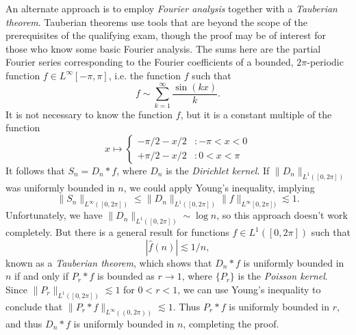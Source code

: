\documentclass[answers]{exam}
\theoremstyle{problemstyle}
\newcommand{\1}[1]{\textbf{1}_{\left[#1\right]}} %
\begin{document}
\begin{questions}
\begin{solution}
An alternate approach is to employ \emph{Fourier analysis} together with a \emph{Tauberian theorem}. Tauberian theorems use tools that  are beyond the scope of the prerequisites of the qualifying exam, though the proof may be of interest for those who know some basic Fourier analysis. The sums here are the partial Fourier series corresponding to the Fourier coefficients of a bounded, $2 \pi$-periodic function $f \in L^\infty[-\pi,\pi]$, i.e. the function $f$ such that
%
\[ f \sim \sum_{k = 1}^\infty \frac{\sin(kx)}{k}. \]
%
It is not necessary to know the function $f$, but it is a constant multiple of the function
%
\[ x \mapsto \begin{cases} -\pi/2 - x/2 &: -\pi < x < 0 \\ +\pi/2 - x/2 &: 0 < x < \pi \end{cases} \]
%
It follows that $S_n = D_n * f$, where $D_n$ is the \emph{Dirichlet kernel}. If $\| D_n \|_{L^1([0,2\pi])}$ was uniformly bounded in $n$, we could apply Young's inequality, implying
%
\[ \| S_n \|_{L^\infty([0,2\pi])} \leq \| D_n \|_{L^1([0,2\pi])} \| f \|_{L^\infty[0,2\pi])} \lesssim 1. \]
%
Unfortunately, we have $\| D_n \|_{L^1([0,2\pi])} \sim \log n$, so this approach doesn't work completely. But there is a general result for functions $f \in L^1([0,2\pi])$ such that
%
\[ |\widehat{f}(n)| \lesssim 1/n, \]
%
known as a \emph{Tauberian theorem}, which shows that $D_n * f$ is uniformly bounded in $n$ if and only if $P_r * f$ is bounded as $r \to 1$, where $\{ P_r \}$ is the \emph{Poisson kernel}. Since $\| P_r \|_{L^1([0,2\pi])} \lesssim 1$ for $0 < r < 1$, we can use Young's inequality to conclude that $\| P_r * f \|_{L^\infty((0,2\pi))} \lesssim 1$. Thus $P_r * f$ is uniformly bounded in $r$, and thus $D_n * f$ is uniformly bounded in $n$, completing the proof.

\end{solution}


\end{questions}
\end{document}
